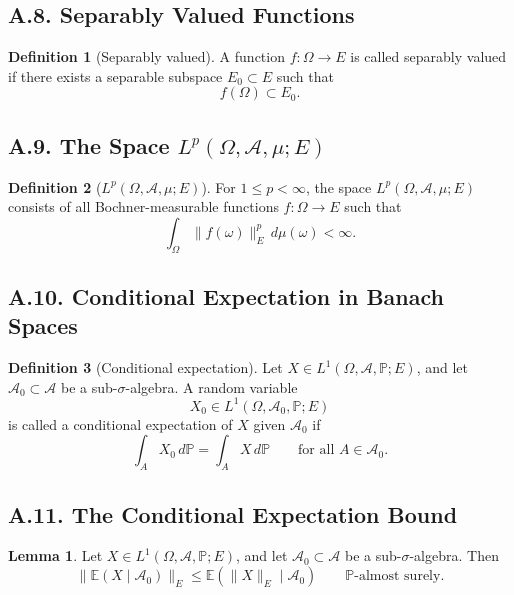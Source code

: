 \documentclass[11pt]{article}
\theoremstyle{definition}
\newtheorem{definition}{Definition}
\newtheorem{lemma}{Lemma}
\theoremstyle{remark}
\begin{document}
\subsection*{A.8. Separably Valued Functions}
\begin{definition}[Separably valued]
A function \(f:\Omega\to E\) is called separably valued if there exists a separable subspace \(E_0\subset E\) such that
\[
f(\Omega)\subset E_0.
\]
\end{definition}

\subsection*{A.9. The Space \(L^p(\Omega,\mathcal A,\mu;E)\)}
\begin{definition}[\(L^p(\Omega,\mathcal A,\mu;E)\)]
For \(1\le p<\infty\), the space \(L^p(\Omega,\mathcal A,\mu;E)\) consists of all Bochner-measurable functions \(f:\Omega\to E\) such that
\[
\int_\Omega \|f(\omega)\|_E^p\,d\mu(\omega)<\infty.
\]
\end{definition}

\subsection*{A.10. Conditional Expectation in Banach Spaces}
\begin{definition}[Conditional expectation]
Let \(X\in L^1(\Omega,\mathcal A,\mathbb P;E)\), and let \(\mathcal A_0\subset \mathcal A\) be a sub-\(\sigma\)-algebra. A random variable
\[
X_0\in L^1(\Omega,\mathcal A_0,\mathbb P;E)
\]
is called a conditional expectation of \(X\) given \(\mathcal A_0\) if
\[
\int_A X_0\,d\mathbb P=\int_A X\,d\mathbb P
\qquad \text{for all } A\in \mathcal A_0.
\]
\end{definition}

\subsection*{A.11. The Conditional Expectation Bound}
\begin{lemma}
Let \(X\in L^1(\Omega,\mathcal A,\mathbb P;E)\), and let \(\mathcal A_0\subset \mathcal A\) be a sub-\(\sigma\)-algebra. Then
\[
\|\mathbb E(X\mid \mathcal A_0)\|_E\le \mathbb E(\|X\|_E\mid \mathcal A_0)
\qquad \mathbb P\text{-almost surely.}
\]
\end{lemma}
\end{document}
